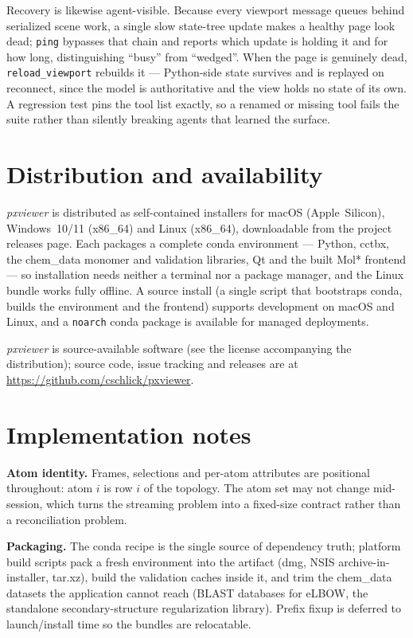 \documentclass[11pt]{article}
\newcommand{\pxviewer}{\emph{pxviewer}}
\begin{document}
Recovery is likewise agent-visible. Because every viewport message queues
behind serialized scene work, a single slow state-tree update makes a
healthy page look dead; \texttt{ping} bypasses that chain and reports which
update is holding it and for how long, distinguishing ``busy'' from
``wedged''. When the page is genuinely dead, \texttt{reload\_viewport}
rebuilds it --- Python-side state survives and is replayed on reconnect,
since the model is authoritative and the view holds no state of its own. A
regression test pins the tool list exactly, so a renamed or missing tool
fails the suite rather than silently breaking agents that learned the
surface.

\section{Distribution and availability}

\pxviewer{} is distributed as self-contained installers for macOS
(Apple~Silicon), Windows~10/11 (x86\_64) and Linux (x86\_64), downloadable
from the project releases page. Each packages a complete conda environment
--- Python, cctbx, the chem\_data monomer and validation libraries, Qt and
the built Mol* frontend --- so installation needs neither a terminal nor a
package manager, and the Linux bundle works fully offline. A source
install (a single script that bootstraps conda, builds the environment and
the frontend) supports development on macOS and Linux, and a
\texttt{noarch} conda package is available for managed deployments.

\pxviewer{} is source-available software (see the license accompanying the
distribution); source code, issue tracking and releases are at
\url{https://github.com/cschlick/pxviewer}.

\section{Implementation notes}

\textbf{Atom identity.} Frames, selections and per-atom attributes are
positional throughout: atom $i$ is row $i$ of the topology. The atom set may
not change mid-session, which turns the streaming problem into a fixed-size
contract rather than a reconciliation problem.

\textbf{Packaging.} The conda recipe is the single source of dependency
truth; platform build scripts pack a fresh environment into the artifact
(dmg, NSIS archive-in-installer, tar.xz), build the validation caches inside
it, and trim the chem\_data datasets the application cannot reach (BLAST
databases for eLBOW, the standalone secondary-structure regularization
library). Prefix fixup is deferred to launch/install time so the bundles are
relocatable.
\end{document}
